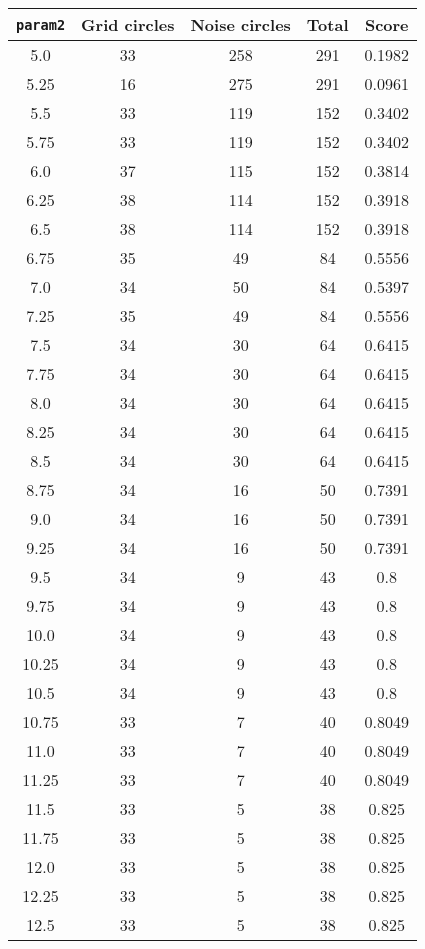 \documentclass[letterpaper, 12pt]{article}
\begin{document}
\begin{longtable}{|c|c|c|c|c|}
\hline
\textbf{\texttt{param2}} & \textbf{Grid circles} & \textbf{Noise circles} & \textbf{Total} & \textbf{Score} \\
\hline
5.0 & 33 & 258 & 291 & 0.1982 \\
\hline
5.25 & 16 & 275 & 291 & 0.0961 \\
\hline
5.5 & 33 & 119 & 152 & 0.3402 \\
\hline
5.75 & 33 & 119 & 152 & 0.3402 \\
\hline
6.0 & 37 & 115 & 152 & 0.3814 \\
\hline
6.25 & 38 & 114 & 152 & 0.3918 \\
\hline
6.5 & 38 & 114 & 152 & 0.3918 \\
\hline
6.75 & 35 & 49 & 84 & 0.5556 \\
\hline
7.0 & 34 & 50 & 84 & 0.5397 \\
\hline
7.25 & 35 & 49 & 84 & 0.5556 \\
\hline
7.5 & 34 & 30 & 64 & 0.6415 \\
\hline
7.75 & 34 & 30 & 64 & 0.6415 \\
\hline
8.0 & 34 & 30 & 64 & 0.6415 \\
\hline
8.25 & 34 & 30 & 64 & 0.6415 \\
\hline
8.5 & 34 & 30 & 64 & 0.6415 \\
\hline
8.75 & 34 & 16 & 50 & 0.7391 \\
\hline
9.0 & 34 & 16 & 50 & 0.7391 \\
\hline
9.25 & 34 & 16 & 50 & 0.7391 \\
\hline
9.5 & 34 & 9 & 43 & 0.8 \\
\hline
9.75 & 34 & 9 & 43 & 0.8 \\
\hline
10.0 & 34 & 9 & 43 & 0.8 \\
\hline
10.25 & 34 & 9 & 43 & 0.8 \\
\hline
10.5 & 34 & 9 & 43 & 0.8 \\
\hline
10.75 & 33 & 7 & 40 & 0.8049 \\
\hline
11.0 & 33 & 7 & 40 & 0.8049 \\
\hline
11.25 & 33 & 7 & 40 & 0.8049 \\
\hline
11.5 & 33 & 5 & 38 & 0.825 \\
\hline
11.75 & 33 & 5 & 38 & 0.825 \\
\hline
12.0 & 33 & 5 & 38 & 0.825 \\
\hline
12.25 & 33 & 5 & 38 & 0.825 \\
\hline
12.5 & 33 & 5 & 38 & 0.825 \\

\end{longtable}
\end{document}
